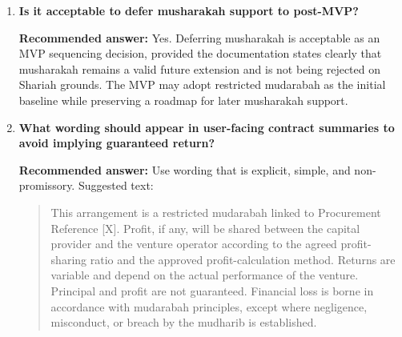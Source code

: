 \documentclass[11pt]{article}
\begin{document}
\begin{enumerate}[leftmargin=1.8em,label=\textbf{Q\arabic*.}]
    \textbf{Recommended answer:} Yes. In addition to the draft fields, add the following:
    \begin{itemize}[leftmargin=1.5em]
        \item \texttt{venture\_description};
        \item \texttt{permitted\_use\_of\_funds};
        \item \texttt{shariah\_pronouncement\_reference};
        \item \texttt{distribution\_period\_start} and \texttt{distribution\_period\_end};
        \item \texttt{approved\_profit\_definition};
        \item \texttt{deductible\_cost\_policy\_version};
        \item \texttt{designated\_collection\_account} and \texttt{designated\_disbursement\_account};
        \item \texttt{evidence\_bundle\_id};
        \item \texttt{security\_or\_collateral\_details}, if any;
        \item \texttt{recourse\_on\_breach};
        \item \texttt{distribution\_approval\_status};
        \item \texttt{exception\_flag};
        \item \texttt{amendment\_log};
        \item \texttt{shariah\_noncompliance\_flag} and \texttt{purification\_record}, if applicable.
    \end{itemize}

    \item \textbf{Is it acceptable to defer musharakah support to post-MVP?}

    \textbf{Recommended answer:} Yes. Deferring musharakah is acceptable as an MVP sequencing decision, provided the documentation states clearly that musharakah remains a valid future extension and is not being rejected on Shariah grounds. The MVP may adopt restricted mudarabah as the initial baseline while preserving a roadmap for later musharakah support.

    \item \textbf{What wording should appear in user-facing contract summaries to avoid implying guaranteed return?}

    \textbf{Recommended answer:} Use wording that is explicit, simple, and non-promissory. Suggested text:

    \begin{quote}
    This arrangement is a restricted mudarabah linked to Procurement Reference [X]. Profit, if any, will be shared between the capital provider and the venture operator according to the agreed profit-sharing ratio and the approved profit-calculation method. Returns are variable and depend on the actual performance of the venture. Principal and profit are not guaranteed. Financial loss is borne in accordance with mudarabah principles, except where negligence, misconduct, or breach by the mudharib is established.
    \end{quote}


\end{enumerate}
\end{document}
